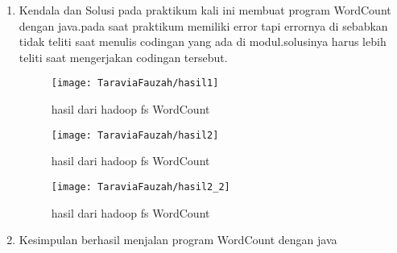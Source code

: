 \begin{enumerate}
\item Kendala dan Solusi
\newline pada praktikum kali ini membuat program WordCount dengan java.pada saat praktikum memiliki error tapi errornya di sebabkan tidak teliti saat menulis codingan yang ada di modul.solusinya harus lebih teliti saat mengerjakan codingan tersebut.

\begin{figure}[!ht]
\texttt{[image: TaraviaFauzah/hasil1]}
\caption{hasil dari hadoop fs WordCount}
\label{gam:perkuliahan2-12}
\end{figure}

\begin{figure}[!ht]
\texttt{[image: TaraviaFauzah/hasil2]}
\caption{hasil dari hadoop fs WordCount}
\label{gam:perkuliahan2-12}
\end{figure}

\begin{figure}[!ht]
\texttt{[image: TaraviaFauzah/hasil2\_2]}
\caption{hasil dari hadoop fs WordCount}
\label{gam:perkuliahan2-12}
\end{figure}

\item Kesimpulan
\newline berhasil menjalan program WordCount dengan java

\end{enumerate}